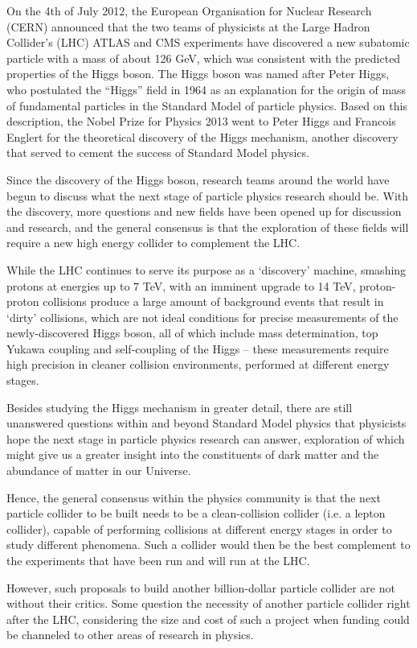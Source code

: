 On the 4th of July 2012, the European Organisation for Nuclear Research (CERN) announced that the two teams of physicists at the Large Hadron Collider's (LHC) ATLAS and CMS experiments have discovered a new subatomic particle with a mass of about 126 GeV, which was consistent with the predicted properties of the Higgs boson. The Higgs boson was named after Peter Higgs, who postulated the ``Higgs'' field in 1964 as an explanation for the origin of mass of fundamental particles in the Standard Model of particle physics. Based on this description, the Nobel Prize for Physics 2013 went to Peter Higgs and Francois Englert for the theoretical discovery of the Higgs mechanism, another discovery that served to cement the success of Standard Model physics.
 
Since the discovery of the Higgs boson, research teams around the world have begun to discuss what the next stage of particle physics research should be. With the discovery, more questions and new fields have been opened up for discussion and research, and the general consensus is that the exploration of these fields will require a new high energy collider to complement the LHC.
 
While the LHC continues to serve its purpose as a `discovery' machine, smashing protons at energies up to 7 TeV, with an imminent upgrade to 14 TeV, proton-proton collisions produce a large amount of background events that result in `dirty' collisions, which are not ideal conditions for precise measurements of the newly-discovered Higgs boson, all of which include mass determination, top Yukawa coupling and self-coupling of the Higgs – these measurements require high precision in cleaner collision environments, performed at different energy stages.
 
Besides studying the Higgs mechanism in greater detail, there are still unanswered questions within and beyond Standard Model physics that physicists hope the next stage in particle physics research can answer, exploration of which might give us a greater insight into the constituents of dark matter and the abundance of matter in our Universe.
 
Hence, the general consensus within the physics community is that the next particle collider to be built needs to be a clean-collision collider (i.e. a lepton collider), capable of performing collisions at different energy stages in order to study different phenomena. Such a collider would then be the best complement to the experiments that have been run and will run at the LHC.
 
However, such proposals to build another billion-dollar particle collider are not without their critics. Some question the necessity of another particle collider right after the LHC, considering the size and cost of such a project when funding could be channeled to other areas of research in physics.